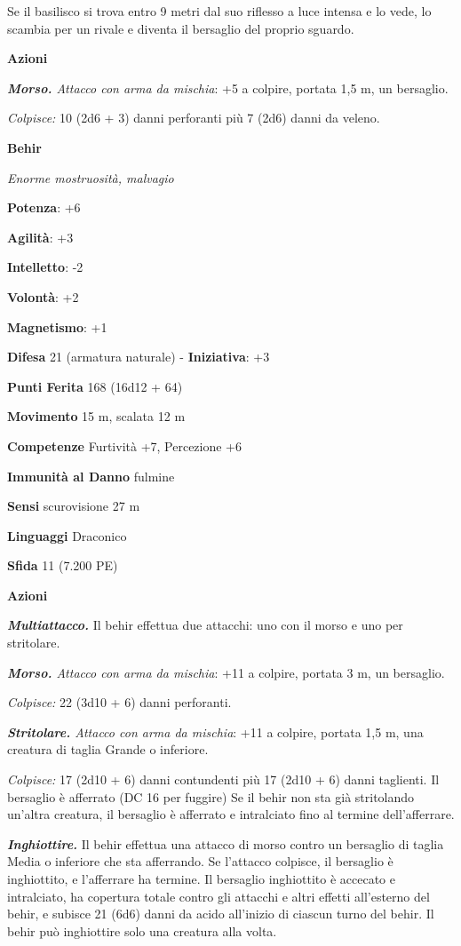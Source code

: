\begin{multicols}{2}
Se il basilisco si trova entro 9 metri dal suo riflesso a luce intensa e
lo vede, lo scambia per un rivale e diventa il bersaglio del proprio
sguardo.

\textbf{Azioni}

\emph{\textbf{Morso.} Attacco con arma da mischia}: +5 a colpire,
portata 1,5 m, un bersaglio.

\emph{Colpisce:} 10 (2d6 + 3) danni perforanti più 7 (2d6) danni da
veleno.




\textbf{Behir}

\emph{Enorme mostruosità, malvagio}

\textbf{Potenza}: +6

\textbf{Agilità}: +3

\textbf{Intelletto}: -2

\textbf{Volontà}: +2

\textbf{Magnetismo}: +1

\textbf{Difesa} 21 (armatura naturale) - \textbf{Iniziativa}: +3

\textbf{Punti Ferita} 168 (16d12 + 64)

\textbf{Movimento} 15 m, scalata 12 m

\textbf{Competenze} Furtività +7, Percezione +6

\textbf{Immunità al Danno} fulmine

\textbf{Sensi} scurovisione 27 m

\textbf{Linguaggi} Draconico

\textbf{Sfida} 11 (7.200 PE)

\textbf{Azioni}

\emph{\textbf{Multiattacco.}} Il behir effettua due attacchi: uno con il
morso e uno per stritolare.

\emph{\textbf{Morso.} Attacco con arma da mischia}: +11 a colpire,
portata 3 m, un bersaglio.

\emph{Colpisce:} 22 (3d10 + 6) danni perforanti.

\emph{\textbf{Stritolare.} Attacco con arma da mischia}: +11 a colpire,
portata 1,5 m, una creatura di taglia Grande o inferiore.

\emph{Colpisce:} 17 (2d10 + 6) danni contundenti più 17 (2d10 + 6) danni
taglienti. Il bersaglio è afferrato (DC 16 per fuggire) Se il behir non
sta già stritolando un'altra creatura, il bersaglio è afferrato e
intralciato fino al termine dell'afferrare.

\emph{\textbf{Inghiottire.}} Il behir effettua una attacco di morso
contro un bersaglio di taglia Media o inferiore che sta afferrando. Se
l'attacco colpisce, il bersaglio è inghiottito, e l'afferrare ha
termine. Il bersaglio inghiottito è accecato e intralciato, ha copertura
totale contro gli attacchi e altri effetti all'esterno del behir, e
subisce 21 (6d6) danni da acido all'inizio di ciascun turno del behir.
Il behir può inghiottire solo una creatura alla volta.


\end{multicols}
